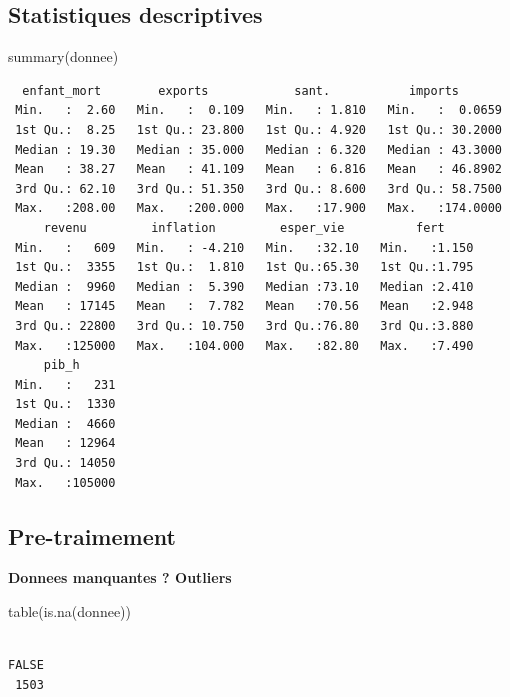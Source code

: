 \documentclass[
]{article}
\newenvironment{Shaded}{}{}
\newcommand{\FunctionTok}[1]{#1}
\newcommand{\NormalTok}[1]{#1}
\begin{document}
\hypertarget{statistiques-descriptives}{%
\subsection{Statistiques descriptives}\label{statistiques-descriptives}}

\begin{Shaded}
\begin{Highlighting}[]
\FunctionTok{summary}\NormalTok{(donnee)}
\end{Highlighting}
\end{Shaded}

\begin{verbatim}
  enfant_mort        exports            sant.           imports        
 Min.   :  2.60   Min.   :  0.109   Min.   : 1.810   Min.   :  0.0659  
 1st Qu.:  8.25   1st Qu.: 23.800   1st Qu.: 4.920   1st Qu.: 30.2000  
 Median : 19.30   Median : 35.000   Median : 6.320   Median : 43.3000  
 Mean   : 38.27   Mean   : 41.109   Mean   : 6.816   Mean   : 46.8902  
 3rd Qu.: 62.10   3rd Qu.: 51.350   3rd Qu.: 8.600   3rd Qu.: 58.7500  
 Max.   :208.00   Max.   :200.000   Max.   :17.900   Max.   :174.0000  
     revenu         inflation         esper_vie          fert      
 Min.   :   609   Min.   : -4.210   Min.   :32.10   Min.   :1.150  
 1st Qu.:  3355   1st Qu.:  1.810   1st Qu.:65.30   1st Qu.:1.795  
 Median :  9960   Median :  5.390   Median :73.10   Median :2.410  
 Mean   : 17145   Mean   :  7.782   Mean   :70.56   Mean   :2.948  
 3rd Qu.: 22800   3rd Qu.: 10.750   3rd Qu.:76.80   3rd Qu.:3.880  
 Max.   :125000   Max.   :104.000   Max.   :82.80   Max.   :7.490  
     pib_h       
 Min.   :   231  
 1st Qu.:  1330  
 Median :  4660  
 Mean   : 12964  
 3rd Qu.: 14050  
 Max.   :105000  
\end{verbatim}

\hypertarget{pre-traimement}{%
\subsection{Pre-traimement}\label{pre-traimement}}

\textbf{Donnees manquantes ? Outliers}

\begin{Shaded}
\begin{Highlighting}[]
\FunctionTok{table}\NormalTok{(}\FunctionTok{is.na}\NormalTok{(donnee))}
\end{Highlighting}
\end{Shaded}

\begin{verbatim}

FALSE 
 1503 
\end{verbatim}
\end{document}
